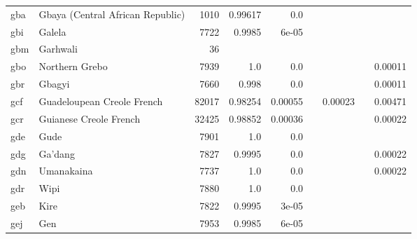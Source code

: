 \documentclass[11pt]{article}
\begin{document}
\begin{table*}[h]
{\begin{tabular}{llrrrrrrr}
gba         & Gbaya (Central African Republic)         & 1010         & 0.99617         & 0.0         &          &          &          &          \\

gbi         & Galela         & 7722         & 0.9985         & 6e-05         &          &          &          &          \\

gbm         & Garhwali         & 36         &          &          &          &          &          &          \\

gbo         & Northern Grebo         & 7939         & 1.0         & 0.0         &          &          &          & 0.00011         \\

gbr         & Gbagyi         & 7660         & 0.998         & 0.0         &          &          &          & 0.00011         \\

gcf         & Guadeloupean Creole French         & 82017         & 0.98254         & 0.00055         &          & 0.00023         &          & 0.00471         \\

gcr         & Guianese Creole French         & 32425         & 0.98852         & 0.00036         &          &          &          & 0.00022         \\

gde         & Gude         & 7901         & 1.0         & 0.0         &          &          &          &          \\

gdg         & Ga'dang         & 7827         & 0.9995         & 0.0         &          &          &          & 0.00022         \\

gdn         & Umanakaina         & 7737         & 1.0         & 0.0         &          &          &          & 0.00022         \\

gdr         & Wipi         & 7880         & 1.0         & 0.0         &          &          &          &          \\

geb         & Kire         & 7822         & 0.9995         & 3e-05         &          &          &          &          \\

gej         & Gen         & 7953         & 0.9985         & 6e-05         &          &          &          &          \\


\end{tabular}}
\end{table*}
\end{document}
